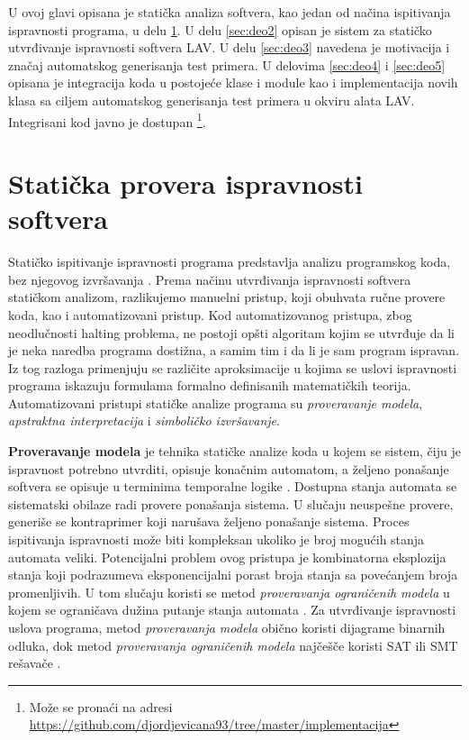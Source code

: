 \documentclass[12pt,oneside]{memoir}
\begin{document}
U ovoj glavi opisana je statička analiza softvera, kao jedan od načina ispitivanja ispravnosti programa, u delu \ref{sec:deo1}. U delu \ref{sec:deo2} opisan je sistem za statičko utvrđivanje ispravnosti softvera LAV. U delu \ref{sec:deo3} navedena je motivacija i značaj automatskog generisanja test primera. U delovima \ref{sec:deo4} i \ref{sec:deo5} opisana je integracija koda u postojeće klase i module kao i implementacija novih klasa sa ciljem automatskog generisanja test primera u okviru alata LAV. Integrisani kod javno je dostupan \footnote{Može se pronaći na adresi \url{https://github.com/djordjevicana93/tree/master/implementacija}}.


\section{Statička provera ispravnosti softvera} \label{sec:deo1}
Statičko ispitivanje ispravnosti programa predstavlja analizu programskog koda, bez njegovog izvršavanja \cite{StaticVerification}. Prema načinu utvrđivanja ispravnosti softvera statičkom analizom, razlikujemo manuelni pristup, koji obuhvata ručne provere koda, kao i automatizovani pristup. Kod automatizovanog pristupa, zbog neodlučnosti halting problema, ne postoji opšti algoritam kojim se utvrđuje da li je neka naredba programa dostižna, a samim tim i da li je sam program ispravan. Iz tog razloga primenjuju se različite aproksimacije u kojima se uslovi ispravnosti programa iskazuju formulama formalno definisanih matematičkih teorija. Automatizovani pristupi statičke analize programa su \textit{proveravanje modela}, \textit{apstraktna interpretacija} i \textit{simboličko izvršavanje}.
\par
\textbf{Proveravanje modela} je tehnika statičke analize koda u kojem se sistem, čiju je ispravnost potrebno utvrditi, opisuje konačnim automatom, a željeno ponašanje softvera se opisuje u terminima temporalne logike \cite{TemporalLogic}. Dostupna stanja automata se sistematski obilaze radi provere ponašanja sistema. U slučaju neuspešne provere, generiše se kontraprimer koji narušava željeno ponašanje sistema. Proces ispitivanja ispravnosti može biti kompleksan ukoliko je broj mogućih stanja automata veliki. Potencijalni problem ovog pristupa je kombinatorna eksplozija stanja koji podrazumeva eksponencijalni porast broja stanja sa povećanjem broja promenljivih.
U tom slučaju koristi se metod \textit{proveravanja ograničenih modela} u kojem se ograničava dužina putanje stanja automata \cite{Verification}. Za utvrđivanje ispravnosti uslova programa, metod \textit{proveravanja modela} obično koristi dijagrame binarnih odluka, dok metod \textit{proveravanja ograničenih modela} najčešče koristi SAT ili SMT rešavače \cite{ModelCheck}.
\end{document}
